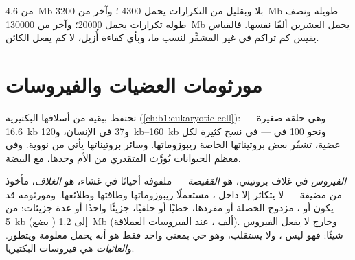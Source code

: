 \begin{example}\label{ex:b1:genomes:sizes}
 من \qty{4.6}{Mb} بلا  وبقليل من التكرارات يحمل
\num{4300} ؛ وآخر من \qty{3200}{Mb}  طويلة ونصف طوله
تكرارات يحمل \num{20000}؛ وآخر من \qty{130000}{Mb} يحمل العشرين ألفًا
نفسها. فالقياس يقيس كم تراكم في  غير المشفِّر لنسب ما، وبأي كفاءة
أُزيل، لا كم يفعل الكائن.
\end{example}

\section{مورثومات العضيات والفيروسات}

\begin{definition}\label{def:b1:genomes:organelle}
تحتفظ   ببقية من  أسلافها البكتيرية
(\cref{ch:b1:eukaryotic-cell}): وهي حلقة صغيرة --- \qty{16.6}{kb}
و37  في  الإنسان، و\qtyrange{120}{160}{kb} ونحو 100
 في  --- في نسخ كثيرة لكل عضية، تشفّر بعض بروتيناتها
الخاصة  ريبوزوماتها. وسائر بروتيناتها يأتي من  نووية. وفي
معظم الحيوانات يُورَّث  المتقدري من الأم وحدها، مع 
البيضة.
\end{definition}

\begin{definition}[الفيروس]\label{def:b1:genomes:virus}
\emph{الفيروس}  في غلاف بروتيني، هو \emph{القفيصة} --- ملفوفة
أحيانًا في غشاء، هو \emph{الغلاف}، مأخوذ من  مضيفة --- لا يتكاثر
إلا داخل ، مستعملًا ريبوزوماتها وطاقتها وطلائعها. ومورثومه قد
يكون  أو ، مزدوج الخصلة أو مفردها، خطيًا أو حلقيًا، جزيئًا
واحدًا أو عدة جزيئات: من \qty{5}{kb} (بضع ) إلى \qty{1.2}{Mb}
(ألف ، عند الفيروسات العملاقة). وخارج  لا يفعل الفيروس
شيئًا: فهو ليس ، ولا يستقلب، وهو حي بمعنى واحد فقط هو أنه يحمل
معلومة ويتطور. و\emph{العاثيات} هي فيروسات البكتيريا.
\end{definition}

